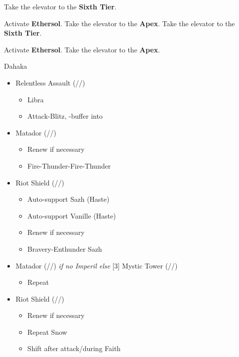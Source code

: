 \begin{paracol}{2}
	\renewcommand{\first}{[1] Riot Shield (\syn/\sen/\rav)}
	\renewcommand{\second}{[2] Relentless Assault (\com/\rav/\rav)}
	\renewcommand{\third}{[3] Mystic Tower (\rav/\sen/\rav)}
	\renewcommand{\fourth}{[4] Aggression (\com/\com/\rav)}
	\renewcommand{\fifth}{[5] Matador (\rav/\sen/\sab)}
	\renewcommand{\sixth}{[6] Aggression (\com/\com/\rav)}

	Take the elevator to the \textbf{Sixth Tier}.

	Activate \textbf{Ethersol}.
	Take the elevator to the \textbf{Apex}.
	\switchcolumn
	Take the elevator to the \textbf{Sixth Tier}.

	Activate \textbf{Ethersol}.
	Take the elevator to the \textbf{Apex}.
	\switchcolumn*
	\begin{battle}{Dahaka}
		\begin{itemize}
			\item \second
			      \begin{itemize}
				      \item Libra
				      \item Attack-Blitz, \rav-buffer into
			      \end{itemize}
			\item \fifth
			      \begin{itemize}
				      \item Renew if necessary
				      \item Fire-Thunder-Fire-Thunder
			      \end{itemize}
			\item \first
			      \begin{itemize}
				      \item Auto-support Sazh (Haste)
				      \item Auto-support Vanille (Haste)
				      \item Renew if necessary
				      \item Bravery-Enthunder Sazh
			      \end{itemize}
			\item \fifth \textit{ if no Imperil else } \third
			      \begin{itemize}
				      \item Repeat
			      \end{itemize}
			\item \first
			      \begin{itemize}
				      \item Renew if necessary
				      \item Repeat Snow
				      \item Shift after attack/during Faith

\end{itemize}
\end{itemize}
\end{battle}
\end{paracol}
